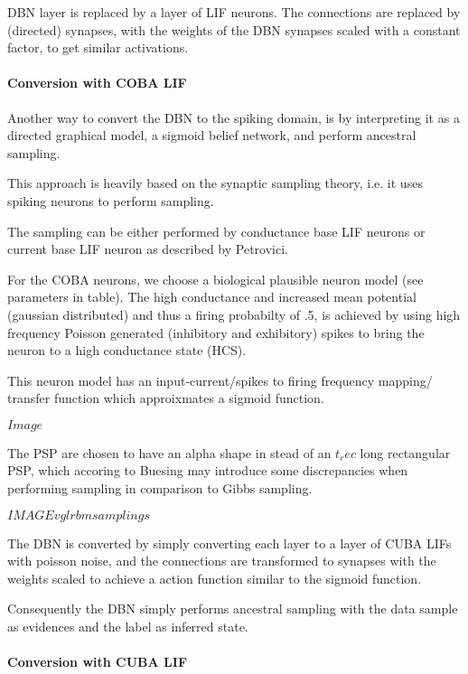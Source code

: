DBN layer is replaced by a layer of LIF neurons. 
The connections are replaced by (directed) synapses, with the weights of the DBN synapses scaled with a constant factor, to get similar activations.
 

\paragraph{Conversion with COBA LIF}

Another way to convert the DBN to the spiking domain, is by interpreting it as a directed graphical model, a sigmoid belief network, and perform ancestral sampling.

This approach is heavily based on the synaptic sampling theory, i.e. it uses spiking neurons to perform sampling.

The sampling can be either performed by conductance base LIF neurons or current base LIF neuron as described by Petrovici.

For the COBA neurons, we choose a biological plausible neuron model (see parameters in table). 
The high conductance and increased mean potential (gaussian distributed) and thus a firing probabilty of .5, is achieved by using high frequency Poisson generated (inhibitory and exhibitory) spikes to bring the neuron to a high conductance state (HCS). 

This neuron model has an input-current/spikes to firing frequency mapping/ transfer function which approixmates a sigmoid function.

$Image$

The PSP are chosen to have an alpha shape in stead of an $t_rec$ long rectangular PSP, which accoring to Buesing may introduce some discrepancies when performing sampling in comparison to Gibbs sampling.

$IMAGE vgl rbm samplings$     
  
The DBN is converted by simply converting each layer to a layer of CUBA LIFs with poisson noise, and the connections are transformed to synapses with the weights scaled to achieve a action function similar to the sigmoid function.

Consequently the DBN simply performs ancestral sampling with the data sample as evidences and the label as inferred state.   


\paragraph{Conversion with CUBA LIF}

